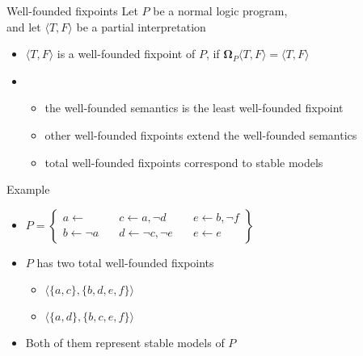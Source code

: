 \begin{frame}{Well-founded fixpoints}
  \bigskip
  Let $P$ be a normal logic program,\\ and
  let $\langle T,F \rangle$ be a partial interpretation
  \medskip
  \begin{itemize}
  \item<1->
    $\langle T,F \rangle$ is a \alert{well-founded fixpoint} of $P$,
    if
    ${\mathbf{\Omega}}_P\langle T,F \rangle = \langle T,F \rangle$
  \medskip
  \item<2-> []
    \begin{itemize}\normalsize
    \item the well-founded semantics is the least well-founded fixpoint
      \smallskip
    \item other well-founded fixpoints extend the well-founded semantics
      \smallskip
    \item \alert<3>{total well-founded fixpoints correspond to stable models}
    \end{itemize}
  \end{itemize}
\end{frame}
\begin{frame}{Example}
  \bigskip
  \begin{itemize}
  \item<1->
    \(
    P
    =
    \left\{
      \begin{array}{lll}
        a \leftarrow                \quad &
        c \leftarrow a, \neg d      \quad &
        e \leftarrow b, \neg f
        \\
        b \leftarrow \neg a         \quad &
        d \leftarrow \neg c, \neg e \quad &
        e \leftarrow e
      \end{array}
    \right\}
    \)
    \bigskip
  \item<2-> $P$ has two total well-founded fixpoints
    \smallskip
    \begin{itemize}\normalsize
    \item<3-> $\langle \{a,c\}, \{b,d,e,f\} \rangle$
    \item<3-> $\langle \{a,d\}, \{b,c,e,f\} \rangle$
    \end{itemize}
    \medskip
  \item <4-> Both of them represent stable models of $P$
  \end{itemize}
\end{frame}
